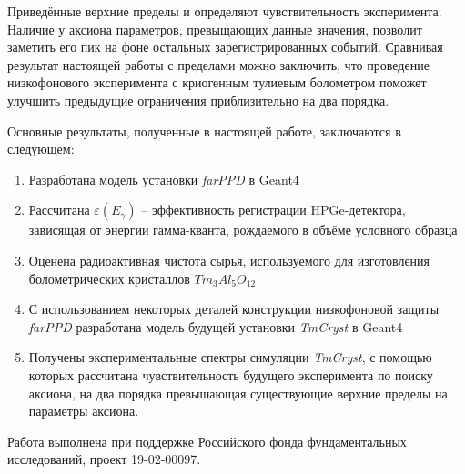 \documentclass[a4paper,article,14pt]{extarticle}
\begin{document}
Приведённые верхние пределы и определяют чувствительность эксперимента. Наличие у аксиона параметров, превыщающих данные значения, позволит заметить его пик на фоне остальных зарегистрированных событий. Сравнивая результат настоящей работы с пределами \cite{newlimits_tm} можно заключить, что проведение низкофонового эксперимента с криогенным тулиевым болометром поможет улучшить предыдущие ограничения приблизительно на два порядка.

Основные результаты, полученные в настоящей работе, заключаются в следующем:

\begin{enumerate}
    \item Разработана модель установки \textit{farPPD} в Geant4
    \item Рассчитана $\varepsilon \left( E_{\gamma} \right)$ -- эффективность регистрации HPGe-детектора, зависящая от энергии гамма-кванта, рождаемого в объёме условного образца
    \item Оценена радиоактивная чистота сырья, используемого для изготовления болометрических кристаллов $Tm_3Al_5O_{12}$
    \item С использованием некоторых деталей конструкции низкофоновой защиты \textit{farPPD} разработана модель будущей установки \textit{TmCryst} в Geant4
    \item Получены экспериментальные спектры симуляции \textit{TmCryst}, с помощью которых рассчитана чувствительность будущего эксперимента по поиску аксиона, на два порядка превышающая существующие верхние пределы на параметры аксиона.
    \end{enumerate}
    
Работа выполнена при поддержке Российского фонда фундаментальных исследований, проект 19-02-00097.
    

\newpage

\printbibliography[title={Источники}]{}
\end{document}
